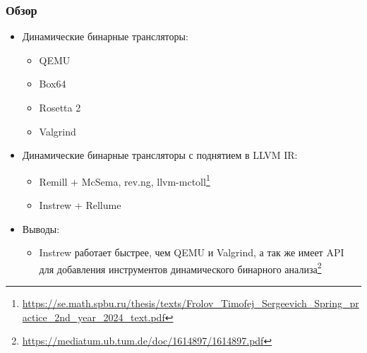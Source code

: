 \documentclass{beamer}
\begin{document}
\begin{frame}
  \frametitle{Обзор}
  \begin{itemize}
    \item Динамические бинарные трансляторы:
          \begin{itemize}
            \item QEMU
            \item Box64
            \item Rosetta 2
            \item Valgrind
          \end{itemize}
    \item Динамические бинарные трансляторы с поднятием в LLVM IR:
          \begin{itemize}
            \item Remill + McSema, rev.ng, llvm-mctoll\footnote{\href{https://se.math.spbu.ru/thesis/texts/Frolov\_Timofej\_Sergeevich\_Spring\_practice\_2nd\_year\_2024\_text.pdf}{https://se.math.spbu.ru/thesis/texts/Frolov\_Timofej\_Sergeevich\_Spring\_practice\_2nd\_year\_2024\_text.pdf}}
            \item Instrew + Rellume
          \end{itemize}
    \item Выводы:
          \begin{itemize}
            \item Instrew работает быстрее, чем QEMU и Valgrind, а так же имеет API для добавления инструментов динамического бинарного анализа\footnote{\href{https://mediatum.ub.tum.de/doc/1614897/1614897.pdf}{https://mediatum.ub.tum.de/doc/1614897/1614897.pdf}}
          \end{itemize}
  \end{itemize}


\end{frame}

\end{document}
